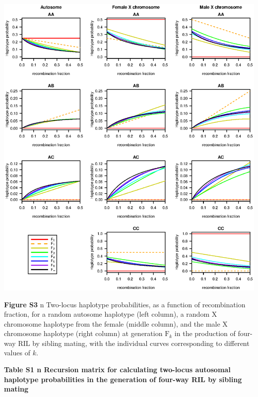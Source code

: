 \documentclass[9pt,letterpaper,twoside]{article}
\begin{document}
{
\centering
\includegraphics[width=\textwidth]{Figs/happrob_fig.eps}

\bigskip
\textbf{Figure S3} {\color{white} n} Two-locus haplotype probabilities, as a function of
recombination fraction, for 
a random autosome haplotype (left column),  a random X
chromosome haplotype
from the female (middle column), and the male X chromosome haplotype
(right column)  at
generation $\text{F}_k$ in the production of four-way RIL by sibling
mating, with the individual curves corresponding to different values
of $k$.
}






\newpage


\noindent \textbf{Table S1 {\color{white} n} Recursion matrix for calculating
two-locus autosomal haplotype probabilities in the generation of four-way RIL by
sibling mating}

\bigskip
\end{document}

